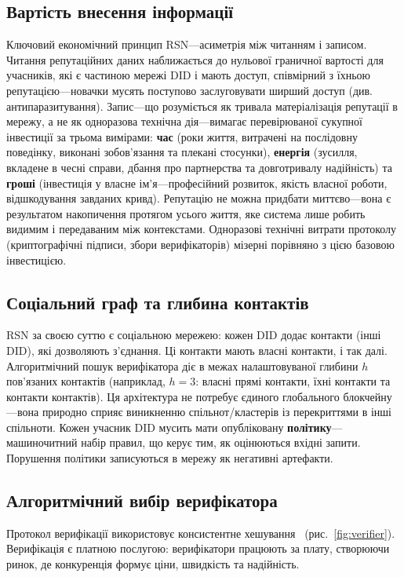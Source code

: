 \documentclass[11pt,a4paper,twocolumn]{article}
\begin{document}
\subsection{Вартість внесення інформації}

Ключовий економічний принцип RSN---асиметрія між читанням і записом. Читання репутаційних даних наближається до нульової граничної вартості для учасників, які є частиною мережі DID і мають доступ, співмірний з їхньою репутацією---новачки мусять поступово заслуговувати ширший доступ (див. антипаразитування). Запис---що розуміється як тривала матеріалізація репутації в мережу, а не як одноразова технічна дія---вимагає перевірюваної сукупної інвестиції за трьома вимірами: \textbf{час} (роки життя, витрачені на послідовну поведінку, виконані зобов'язання та плекані стосунки), \textbf{енергія} (зусилля, вкладене в чесні справи, дбання про партнерства та довготривалу надійність) та \textbf{гроші} (інвестиція у власне ім'я---професійний розвиток, якість власної роботи, відшкодування завданих кривд). Репутацію не можна придбати миттєво---вона є результатом накопичення протягом усього життя, яке система лише робить видимим і передаваним між контекстами. Одноразові технічні витрати протоколу (криптографічні підписи, збори верифікаторів) мізерні порівняно з цією базовою інвестицією.

\subsection{Соціальний граф та глибина контактів}

RSN за своєю суттю є соціальною мережею: кожен DID додає контакти (інші DID), які дозволяють з'єднання. Ці контакти мають власні контакти, і так далі. Алгоритмічний пошук верифікатора діє в межах налаштовуваної глибини $h$ пов'язаних контактів (наприклад, $h=3$: власні прямі контакти, їхні контакти та контакти контактів). Ця архітектура не потребує єдиного глобального блокчейну---вона природно сприяє виникненню спільнот/кластерів із перекриттями в інші спільноти. Кожен учасник DID мусить мати опубліковану \textbf{політику}---машиночитний набір правил, що керує тим, як оцінюються вхідні запити. Порушення політики записуються в мережу як негативні артефакти.

\subsection{Алгоритмічний вибір верифікатора}

Протокол верифікації використовує консистентне хешування~\cite{karger1997} (рис.~\ref{fig:verifier}). Верифікація є платною послугою: верифікатори працюють за плату, створюючи ринок, де конкуренція формує ціни, швидкість та надійність.
\end{document}
